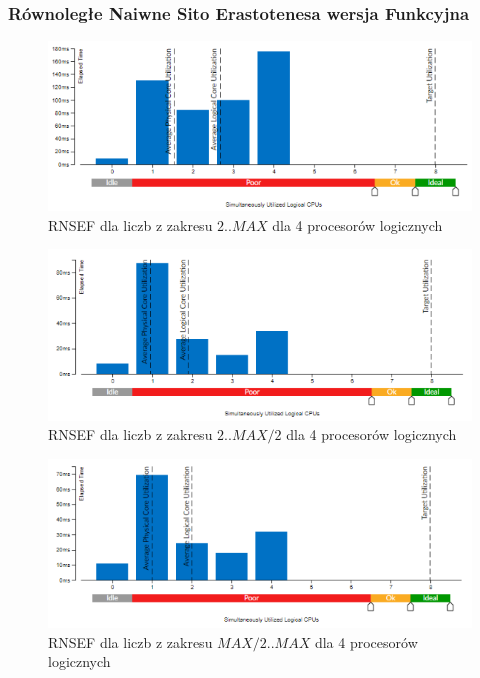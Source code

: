 \documentclass{article}
\begin{document}
            \subsubsection{Równoległe Naiwne Sito Erastotenesa wersja Funkcyjna}
                \begin{figure}[H]
                    \includegraphics[width=13cm]{rownolegly_funcion4_2_MAX}
                    \caption{\gls{RNSEF} dla liczb z zakresu $2 .. MAX$ dla 4 procesorów logicznych}
                \end{figure}
                \begin{figure}[H]
                    \includegraphics[width=13cm]{rownolegly_funcion4_2_MAX2}
                    \caption{\gls{RNSEF} dla liczb z zakresu $2 .. MAX / 2$ dla 4 procesorów logicznych}
                \end{figure}
                \begin{figure}[H]
                    \includegraphics[width=13cm]{rownolegly_funcion4_MAX2_MAX}
                    \caption{\gls{RNSEF} dla liczb z zakresu $MAX / 2 .. MAX$ dla 4 procesorów logicznych}
                \end{figure}
\end{document}
